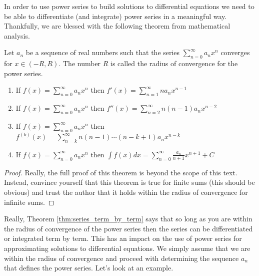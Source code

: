 In order to use power series to build solutions to differential equations we need to be
able to differentiate (and integrate) power series in a meaningful way.  Thankfully, we
are blessed with the following theorem from mathematical analysis.
\begin{thm}\label{thm:series_term_by_term}
    Let $a_n$ be a sequence of real numbers such that the series $\sum_{n=0}^\infty a_n
    x^n$ converges for $x \in (-R,R)$.  The number $R$ is called the radius of convergence
    for the power series.  
    \begin{enumerate}
        \item If $f(x) = \sum_{n=0}^\infty a_n x^n$ then $f'(x) = \sum_{n=1}^\infty n a_n
            x^{n-1}$
        \item If $f(x) = \sum_{n=0}^\infty a_n x^n$ then $f''(x) = \sum_{n=2}^\infty
            n(n-1) a_n x^{n-2}$
        \item If  $f(x) = \sum_{n=0}^\infty a_n x^n$ then $f^{(k)}(x) = \sum_{n=k}^\infty
            n(n-1)\cdots(n-k+1) a_n x^{n-k}$
        \item If $f(x) = \sum_{n=0}^\infty a_n x^n$ then $\int f(x) dx = \sum_{n=0}^\infty
            \frac{a_n}{n+1} x^{n+1}+C$
    \end{enumerate}
\end{thm}
\begin{proof}
    Really, the full proof of this theorem is beyond the scope of this text.  Instead,
    convince yourself that this theorem is true for finite sums (this should be obvious)
    and trust the author that it holds within the radius of convergence for infinite sums.
\end{proof}

Really, Theorem \ref{thm:series_term_by_term} says that so long as you are within the
radius of convergence of the power series then the series can be differentiated or
integrated term by term.  This has an impact on the use of power series for approximating
solutions to differential equations.  We simply assume that we are within the radius of
convergence and proceed with determining the sequence $a_n$ that defines the power series.
Let's look at an example.

